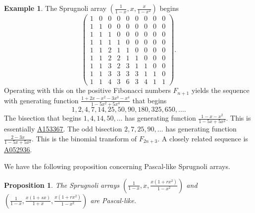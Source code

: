 \documentclass[12pt,reqno]{article}
\newtheorem{proposition}[theorem]{Proposition}
\theoremstyle{definition}
\newtheorem{example}[theorem]{Example}
\newcommand{\seqnum}[1]{\href{http://oeis.org/#1}{\underline{#1}}}
\begin{document}
\begin{example} The Sprugnoli array $\left(\frac{1}{1-x}, x, \frac{x}{1-x^2}\right)$ begins
$$\left(\begin{array}{cccccccccc}
1 & 0 & 0 & 0 & 0 & 0 & 0 & 0 & 0 \\
1 & 1 & 0 & 0 & 0 & 0 & 0 & 0 & 0 \\
1 & 1 & 1 & 0 & 0 & 0 & 0 & 0 & 0 \\
1 & 1 & 1 & 1 & 0 & 0 & 0 & 0 & 0 \\
1 & 1 & 2 & 1 & 1 & 0 & 0 & 0 & 0 \\
1 & 1 & 2 & 2 & 1 & 1 & 0 & 0 & 0 \\
1 & 1 & 3 & 2 & 3 & 1 & 1 & 0 & 0 \\
1 & 1 & 3 & 3 & 3 & 3 & 1 & 1 & 0 \\
1 & 1 & 4 & 3 & 6 & 3 & 4 & 1 & 1
\end{array}\right).$$
Operating with this on the positive Fibonacci numbers $F_{n+1}$ yields the sequence with generating function $\frac{1+2x-x^2-3x^3-x^4}{1-5x^2+5x^4}$ that begins
$$1, 2, 4, 7, 14, 25, 50, 90, 180, 325, 650,\ldots.$$ The bisection that begins $1,4,14,50,\ldots$ has generating function $\frac{1-x-x^2}{1-5x+5x^2}$. This is essentially \seqnum{A153367}. The odd bisection $2,7,25,90,\ldots$ has generating function $\frac{2-3x}{1-5x+5x^2}$. This is the binomial transform of $F_{2n+3}$. A closely related sequence is \seqnum{A052936}.
\end{example}
We have the following proposition concerning Pascal-like Sprugnoli arrays.
\begin{proposition} The Sprugnoli arrays $\left(\frac{1}{1-x}, x, \frac{x(1+rx^2)}{1-x^2}\right)$ and $\left(\frac{1}{1-x}, \frac{x(1+sx)}{1+x}, \frac{x(1+rx^2)}{1-x^2}\right)$ are Pascal-like.
\end{proposition}
\end{document}
